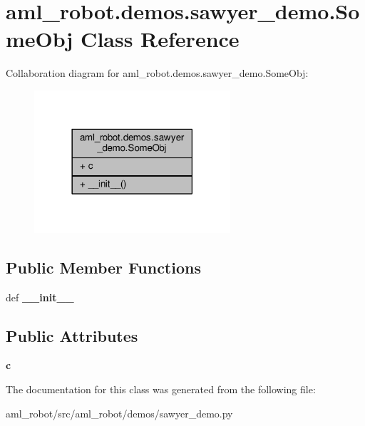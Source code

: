 \hypertarget{classaml__robot_1_1demos_1_1sawyer__demo_1_1_some_obj}{\section{aml\-\_\-robot.\-demos.\-sawyer\-\_\-demo.\-Some\-Obj Class Reference}
\label{classaml__robot_1_1demos_1_1sawyer__demo_1_1_some_obj}
}


Collaboration diagram for aml\-\_\-robot.\-demos.\-sawyer\-\_\-demo.\-Some\-Obj\-:
\nopagebreak
\begin{figure}[H]
\begin{center}
\leavevmode
\includegraphics[width=206pt]{classaml__robot_1_1demos_1_1sawyer__demo_1_1_some_obj__coll__graph}
\end{center}
\end{figure}
\subsection*{Public Member Functions}
\begin{DoxyCompactItemize}
\item 
\hypertarget{classaml__robot_1_1demos_1_1sawyer__demo_1_1_some_obj_a752261be6cef1ccbce7d204ce0898354}{def {\bfseries \-\_\-\-\_\-init\-\_\-\-\_\-}}\label{classaml__robot_1_1demos_1_1sawyer__demo_1_1_some_obj_a752261be6cef1ccbce7d204ce0898354}

\end{DoxyCompactItemize}
\subsection*{Public Attributes}
\begin{DoxyCompactItemize}
\item 
\hypertarget{classaml__robot_1_1demos_1_1sawyer__demo_1_1_some_obj_a3531804107f87308db0d2d26712861bb}{{\bfseries c}}\label{classaml__robot_1_1demos_1_1sawyer__demo_1_1_some_obj_a3531804107f87308db0d2d26712861bb}

\end{DoxyCompactItemize}


The documentation for this class was generated from the following file\-:\begin{DoxyCompactItemize}
\item 
aml\-\_\-robot/src/aml\-\_\-robot/demos/sawyer\-\_\-demo.\-py\end{DoxyCompactItemize}
